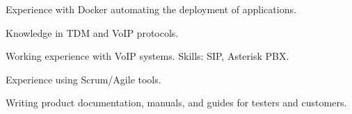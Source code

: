 \begin{cvparagraph}
\begin{svitems}
    \item {Experience with Docker automating the deployment of applications.}
    \item {Knowledge in TDM and VoIP protocols.}
    \item {Working experience with VoIP systems. Skills: SIP, Asterisk PBX.}
    \item {Experience using Scrum/Agile tools.}
    \item {Writing product documentation, manuals, and guides for testers and customers.}
  \end{svitems}
\end{cvparagraph}

